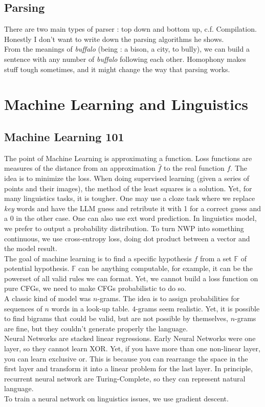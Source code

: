 \documentclass{cours}
\begin{document}
\subsection{Parsing}
There are two main types of parser : top down and bottom up, c.f. Compilation. Honestly I don't want to write down the parsing algorithms he shows.\\
From the meanings of \textsl{buffalo} (being : a bison, a city, to bully), we can build a sentence with any number of \textsl{buffalo} following each other. Homophony makes stuff tough sometimes, and it might change the way that parsing works. 

\section[Class 12 \!: 11/01]{Machine Learning and Linguistics}
\subsection{Machine Learning 101}
The point of Machine Learning is approximating a function. Loss functions are measures of the distance from an approximation $\hat{f}$ to the real function $f$. The idea is to minimize the loss. When doing supervised learning (given a series of points and their images), the method of the least squares is a solution. Yet, for many linguistics tasks, it is tougher. One may use a cloze task where we replace \textit{key} words and have the LLM guess and retribute it with 1 for a correct guess and a 0 in the other case. One can also use ext word prediction. In linguistics model, we prefer to output a probability distribution. To turn NWP into something continuous, we use cross-entropy loss, doing dot product between a vector and the model result. \\
The goal of machine learning is to find a specific hypothesis $f$ from a set $\mathbb{F}$ of potential hypothesis. $\mathbb{F}$ can be anything computable, for example, it can be the powerset of all valid rules we can format. Yet, we cannot build a loss function on pure CFGs, we need to make CFGs probabilistic to do so. \\
A classic kind of model was $n$-grams. The idea is to assign probabilities for sequences of $n$ words in a look-up table. $4$-grams seem realistic. Yet, it is possible to find bigrams that could be valid, but are not possible by themselves, $n$-grams are fine, but they couldn't generate properly the language. \\
Neural Networks are stacked linear regressions. Early Neural Networks were one layer, so they cannot learn XOR. Yet, if you have more than one non-linear layer, you can learn exclusive or. This is because you can rearrange the space in the first layer and transform it into a linear problem for the last layer. In principle, recurrent neural network are Turing-Complete, so they can represent natural language. \\
To train a neural network on linguistics issues, we use gradient descent. 
\end{document}
